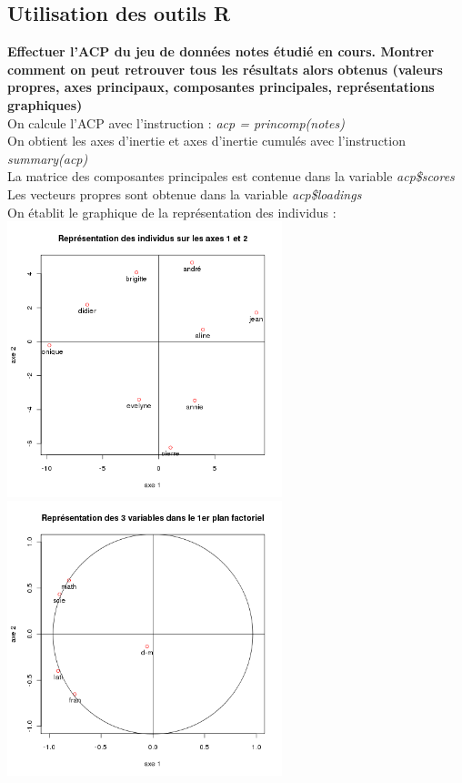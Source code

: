 \documentclass[a4paper, 10pt]{article}
\begin{document}
\subsection{Utilisation des outils R}
\textbf{Effectuer l'ACP du jeu de donn\'ees notes \'etudi\'e en cours. Montrer comment on peut retrouver tous les r\'esultats alors
obtenus (valeurs propres, axes principaux, composantes principales, repr\'esentations graphiques)}\\
On calcule l'ACP avec l'instruction : \textit{acp = princomp(notes)}\\
On obtient les axes d'inertie et axes d'inertie cumul\'es avec l'instruction \textit{summary(acp)}\\
La matrice des composantes principales est contenue dans la variable \textit{acp\$scores}\\
Les vecteurs propres sont obtenue dans la variable \textit{acp\$loadings}\\
On établit le graphique de la repr\'esentation des individus :\\
\includegraphics[height = 8cm, width = 8cm]{plots/plot_acp_notes.png}\\
\includegraphics[height = 8cm, width = 8cm]{plots/plot_correlation_notes.png}
\end{document}
